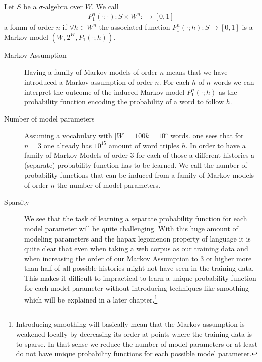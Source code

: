 \documentclass[•]{book}
\begin{document}
\begin{definition}
Let $S$ be a $\sigma$-algebra over $W$.
We call
\begin{align}
P_1^n(\cdot ; \cdot): S\times W^{n}:\longrightarrow [0,1]
\end{align}
a \gls{fomm} of order $n$ if $\forall h\in W^n$ the associated function $P_1^n(\cdot ; h):S\longrightarrow [0,1]$ is a Markov model $(W,2^W,P_1(\cdot ; h))$.
\end{definition}
\begin{remark}
\begin{description}
\item[Markov Assumption]  Having a family of Markov models of order $n$ means that we have introduced a Markov assumption of order $n$. For each $h$ of $n$ words we can interpret the outcome of the induced Markov model $P_1^n(\cdot ; h)$ as the probability function encoding the probability of a word to follow $h$. 
\item[Number of model parameters] Assuming a vocabulary with  $|W| = 100k = 10^5$ words. one sees that for $n=3$ one already has $10^{15}$ amount of word triples $h$.  
In order to have a family of Markov Models of order $3$ for each of those a different histories a (separate) probability function has to be learned.
We call the number of probability functions that can be induced from a family of Markov models of order $n$ the number of model parameters. 
\item[Sparsity] We see that the task of learning a separate probability function for each model parameter will be quite challenging. With this huge amount of modeling parameters and the hapax legomenon property of language it is quite clear that even when taking a web corpus as our training data and when increasing the order of our Markov Assumption to $3$ or higher more than half of all possible histories might not have seen in the training data.
This makes it difficult to impractical to learn a unique probability function for each model parameter without introducing techniques like smoothing which will be explained in a later chapter.\footnote{Introducing smoothing will basically mean that the Markov assumption is weakened locally by decreasing its order at points where the training data is to sparse. In that sense we reduce the number of model parameters or at least do not have unique probability functions for each possible model parameter.}
\end{description}
\end{remark}
\end{document}
